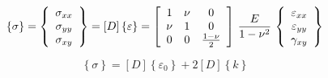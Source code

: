 \begin{equation*}
\left\{\sigma\right\}=\left\{
\begin{array}{c}
\sigma_{xx} \\
\sigma_{yy} \\
\sigma_{xy}
\end{array}
\right\}
=[D]\left\{\varepsilon\right\}=
\left[
\begin{array}{ccc}
\displaystyle 1 & \displaystyle \nu & 0\\
\displaystyle \nu & 1 & \large{0} \\
0& 0 & \frac{1-\nu}{2}
\end{array}
\right]\,
\frac{E}{1-\nu^2}\,
\left\{
\begin{array}{c}
\varepsilon_{xx} \\
\varepsilon_{yy} \\
\gamma_{xy}
\end{array}
\right\}
\end{equation*}

\begin{equation*}
    \left\{ \sigma\right\}=[D]\left\{ \varepsilon_0\right\}+2[D]\left\{ k\right\}
\end{equation*}


